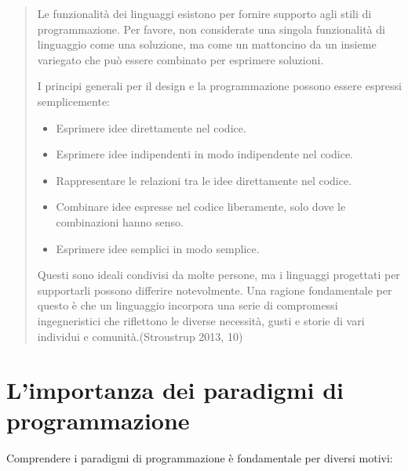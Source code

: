 \documentclass[
  letterpaper,
]{scrbook}
\begin{document}
\begin{quote}
Le funzionalità dei linguaggi esistono per fornire supporto agli stili
di programmazione. Per favore, non considerate una singola funzionalità
di linguaggio come una soluzione, ma come un mattoncino da un insieme
variegato che può essere combinato per esprimere soluzioni.

I principi generali per il design e la programmazione possono essere
espressi semplicemente:

\begin{itemize}
\item
  Esprimere idee direttamente nel codice.
\item
  Esprimere idee indipendenti in modo indipendente nel codice.
\item
  Rappresentare le relazioni tra le idee direttamente nel codice.
\item
  Combinare idee espresse nel codice liberamente, solo dove le
  combinazioni hanno senso.
\item
  Esprimere idee semplici in modo semplice.
\end{itemize}

Questi sono ideali condivisi da molte persone, ma i linguaggi progettati
per supportarli possono differire notevolmente. Una ragione fondamentale
per questo è che un linguaggio incorpora una serie di compromessi
ingegneristici che riflettono le diverse necessità, gusti e storie di
vari individui e comunità.(Stroustrup 2013, 10)
\end{quote}

\section{L'importanza dei paradigmi di
programmazione}\label{limportanza-dei-paradigmi-di-programmazione}

Comprendere i paradigmi di programmazione è fondamentale per diversi
motivi:
\end{document}
